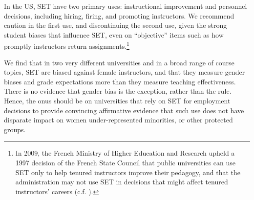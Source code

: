 \documentclass[12pt]{article}
\begin{document}
In the US, SET have two primary uses: 
instructional improvement and personnel 
decisions, including hiring, firing, and promoting instructors. 
We recommend caution in the first use, and discontinuing the second use, 
given the strong student biases that 
influence SET, even on ``objective'' items such as how promptly instructors return
assignments.\footnote{%
  In 2009, the French Ministry of Higher Education and Research upheld a 1997 
  decision of the French State Council that public universities can use SET only to help 
  tenured instructors improve their pedagogy, and that the administration may not use 
  SET in decisions that might affect  tenured instructors' careers (c.f. \citet{Boring2015ofce}). 
}

We find that in two very different universities and in a broad range of course topics, 
SET are biased against female instructors, and that
they measure gender biases and grade expectations more than they measure teaching 
effectiveness.
There is no evidence that gender bias is the exception, rather than the rule.
Hence, the onus should be on universities 
that rely on SET for employment decisions to provide convincing affirmative evidence
that such use does not have disparate impact on women
under-represented minorities, or other protected groups.



\end{document}
